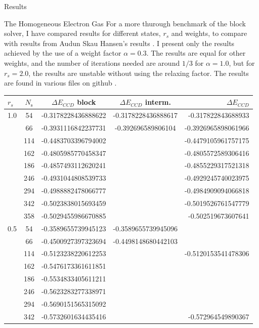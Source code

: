 \documentclass[twoside,english]{uiofysmaster}
\begin{document}
\begin{chapter}{Results}
\begin{section}{The Homogeneous Electron Gas}
		For a more thurough benchmark of the block solver, I have compared results for different states, $r_s$ and weights, to compare with results from Audun Skau Hansen's results \cite{Audun}. I present only the results achieved by the use of a weight factor $\alpha = 0.3$. The results are equal for other weights, and the number of iterations needed are around $1/3$ for $\alpha = 1.0$, but for $r_s = 2.0$, the results are unstable without using the relaxing factor. The results are found in various files on github \cite{WholmenGithub}.
		\begin{table}[H]
			\begin{center}
				\begin{tabular}[center]{l  c  c  c r}
					$r_s$ & $N_{\text{s}}$ & $\Delta E_{CCD}$ block & $\Delta E_{CCD}$ interm. & $\Delta E_{CCD}$ \cite{Audun} \\
					\hline
					1.0 &  54 & -0.3178228436888622 & -0.3178228436888617 & -0.317822843688933 \\
						&  66 & -0.3931116842237731 & -0.392696589806104 & -0.3926965898061966 \\
						& 114 & -0.4483703396794002 & & -0.4479105961757175 \\
						& 162 & -0.4805985770458347 & & -0.4805572589306416 \\
						& 186 & -0.4857493112620241 & & -0.4855229317521318 \\
						& 246 & -0.4931044808539733 & & -0.4929245740023975 \\
						& 294 & -0.4988882478066777 & & -0.4984909094066818 \\
						& 342 & -0.5023838015693459 & & -0.5019526761547779 \\
						& 358 & -0.5029455986670885 & & -0.502519673607641\\
					\hline
					0.5 &  54 & -0.3589655739945123 & -0.3589655739945096 &   \\
						&  66 & -0.4500927397323694 & -0.4498148680442103 & \\
						& 114 & -0.5123238220612253 &  & -0.5120153541478306 \\
						& 162 & -0.5476173361611851 &  & \\
						& 186 & -0.5534833405611211 &  & \\
						& 246 & -0.5623283277338971 &  & \\
						& 294 & -0.5690151565315092 &  & \\
						& 342 & -0.5732601634435416 &  & -0.572964549890367 \\

\end{tabular}
\end{center}
\end{table}
\end{section}
\end{chapter}
\end{document}
